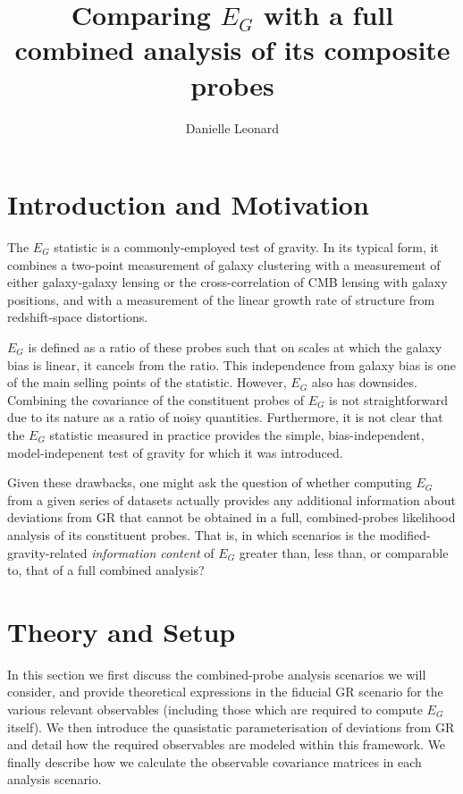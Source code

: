 \documentclass[onecolumn,amsmath,aps,fleqn, superscriptaddress]{revtex4}
\begin{document}
\title{Comparing $E_G$ with a full combined analysis of its composite probes}

\author{Danielle Leonard}   

\maketitle

\section{Introduction and Motivation}
The $E_G$ statistic is a commonly-employed test of gravity. In its typical form, it combines a two-point measurement of galaxy clustering with a measurement of either galaxy-galaxy lensing or the cross-correlation of CMB lensing with galaxy positions, and with a measurement of the linear growth rate of structure from redshift-space distortions.

$E_G$ is defined as a ratio of these probes such that on scales at which the galaxy bias is linear, it cancels from the ratio. This independence from galaxy bias is one of the main selling points of the statistic. However, $E_G$ also has downsides. Combining the covariance of the constituent probes of $E_G$ is not straightforward due to its nature as a ratio of noisy quantities. Furthermore, it is not clear that the $E_G$ statistic measured in practice provides the simple, bias-independent, model-indepenent test of gravity for which it was introduced.

Given these drawbacks, one might ask the question of whether computing $E_G$ from a given series of datasets actually provides any additional information about deviations from GR that cannot be obtained in a full, combined-probes likelihood analysis of its constituent probes. That is, in which scenarios is the modified-gravity-related {\it information content} of $E_G$ greater than, less than, or comparable to, that of a full combined analysis?

\section{Theory and Setup}
In this section we first discuss the combined-probe analysis scenarios we will consider, and provide theoretical expressions in the fiducial GR scenario for the various relevant observables (including those which are required to compute $E_G$ itself). We then introduce the quasistatic parameterisation of deviations from GR and detail how the required observables are modeled within this framework. We finally describe how we calculate the observable covariance matrices in each analysis scenario.
\end{document}
